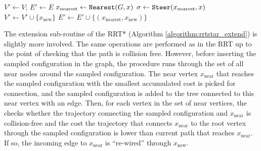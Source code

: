 \documentclass{article}
\begin{document}
\begin{algorithm}[t] \small
    $V' \leftarrow V$; $E' \leftarrow E$\;
    $x_\mathrm{nearest} \leftarrow {\tt Nearest} (G,x)$\; 
    $\sigma \leftarrow {\tt Steer} (x_\mathrm{nearest}, x)$\; 
    {
        $V' \leftarrow V' \cup \{x_\mathrm{new}\}$\; 
        $E' \leftarrow E' \cup \{ (x_\mathrm{nearest}, x_\mathrm{new})\}$\; 
    }
    \caption{ ${\tt Extend}_{RRT} ((V,E), x)$ }
    \label{algorithm:rrt_extend}
\end{algorithm}

The extension sub-routine of the RRT* (Algorithm \ref{algorithm:rrtstar_extend}) is slightly more involved. 
%
The same operations are performed as in the RRT up to the point of checking that the path is collision free. 
%
However, before inserting the sampled configuration in the graph, the procedure runs through the set of all near nodes around the sampled configuration. The near vertex $x_\mathrm{near}$ that reaches the sampled configuration with the smallest accumulated cost is picked for connection, and the sampled configuration is added to the tree connected to this near vertex with an edge. 
%
Then, for each vertex in the set of near vertices, the checks whether the trajectory connecting the sampled configuration and $x_\mathrm{near}$ is collision-free and the cost the trajectory that connects $x_\mathrm{near}$ to the root vertex through the sampled configuration is lower than current path that reaches $x_\mathrm{near}$.
%
If so, the incoming edge to $x_\mathrm{near}$ is ``re-wired'' through $x_\mathrm{new}$.
\end{document}
